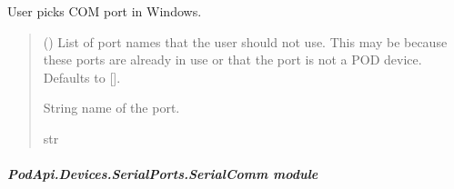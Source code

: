 \documentclass[letterpaper,10pt,english]{sphinxmanual}
\begin{document}
\begin{fulllineitems}
\begin{fulllineitems}
\label{\detokenize{PodApi.Devices.SerialPorts:PodApi.Devices.SerialPorts.PortAccess.FindPorts._ChoosePortWindows}}
\pysigstartsignatures
{}
\pysigstopsignatures
\sphinxAtStartPar
User picks COM port in Windows.
\begin{quote}\begin{description}
\sphinxAtStartPar
{} (\sphinxstyleliteralemphasis{\sphinxupquote{{[}}}\sphinxstyleliteralemphasis{\sphinxupquote{{]}}}\sphinxstyleliteralemphasis{\sphinxupquote{, }}) \textendash{} List of port names that the user should                 not use. This may be because these ports are already in use or that                 the port is not a POD device. Defaults to {[}{]}.

\sphinxAtStartPar
String name of the port.

\sphinxAtStartPar
str

\end{description}\end{quote}

\end{fulllineitems}


\end{fulllineitems}



\subparagraph{PodApi.Devices.SerialPorts.SerialComm module}
\label{\detokenize{PodApi.Devices.SerialPorts:module-PodApi.Devices.SerialPorts.SerialComm}}\label{\detokenize{PodApi.Devices.SerialPorts:podapi-devices-serialports-serialcomm-module}}
\end{document}
